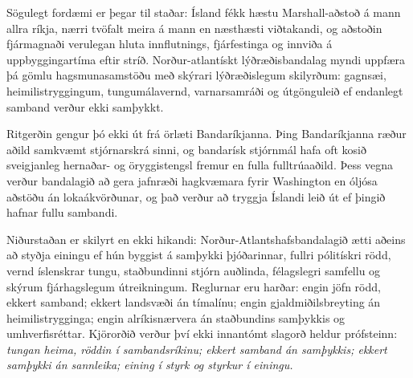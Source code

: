 \documentclass[11pt,a4paper]{article}
\newcommand{\PartyIS}{Norður-Atlantshafsbandalagið}
\begin{document}
Sögulegt fordæmi er þegar til staðar: Ísland fékk hæstu Marshall-aðstoð á mann allra ríkja, nærri tvöfalt meira á mann en næsthæsti viðtakandi, og aðstoðin fjármagnaði verulegan hluta innflutnings, fjárfestinga og innviða á uppbyggingartíma eftir stríð. Norður-atlantískt lýðræðisbandalag myndi uppfæra þá gömlu hagsmunasamstöðu með skýrari lýðræðislegum skilyrðum: gagnsæi, heimilistryggingum, tungumálavernd, varnarsamráði og útgönguleið ef endanlegt samband verður ekki samþykkt.

Ritgerðin gengur þó ekki út frá örlæti Bandaríkjanna. Þing Bandaríkjanna ræður aðild samkvæmt stjórnarskrá sinni, og bandarísk stjórnmál hafa oft kosið sveigjanleg hernaðar- og öryggistengsl fremur en fulla fulltrúaaðild. Þess vegna verður bandalagið að gera jafnræði hagkvæmara fyrir Washington en óljósa aðstöðu án lokaákvörðunar, og það verður að tryggja Íslandi leið út ef þingið hafnar fullu sambandi.

Niðurstaðan er skilyrt en ekki hikandi: \PartyIS{} ætti aðeins að styðja einingu ef hún byggist á samþykki þjóðarinnar, fullri pólitískri rödd, vernd íslenskrar tungu, staðbundinni stjórn auðlinda, félagslegri samfellu og skýrum fjárhagslegum útreikningum. Reglurnar eru harðar: engin jöfn rödd, ekkert samband; ekkert landsvæði án tímalínu; engin gjaldmiðilsbreyting án heimilistrygginga; engin alríkisnærvera án staðbundins samþykkis og umhverfisréttar. Kjörorðið verður því ekki innantómt slagorð heldur prófsteinn: \textit{tungan heima, röddin í sambandsríkinu; ekkert samband án samþykkis; ekkert samþykki án sannleika; eining í styrk og styrkur í einingu.}
\end{document}
